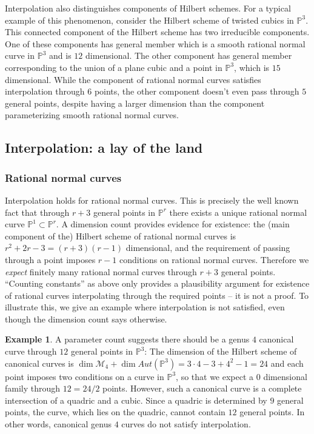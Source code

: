 \documentclass[reqno, 11pt]{amsart}
\theoremstyle{definition}
\theoremstyle{remark}
\numberwithin{equation}{section}
\numberwithin{thm}{section}
\numberwithin{prop}{section}
\numberwithin{lem}{section}
\numberwithin{cor}{section}
\numberwithin{conj}{section}
\numberwithin{defn}{section}
\theoremstyle{plain}
\theoremstyle{definition}
\newtheorem{example}[theorem]{Example}
\newcommand\ssec{\subsection}
\newcommand\sssec{\subsubsection}
\newcommand\bp{{\mathbb P}}
\begin{document}
 Interpolation also distinguishes components of Hilbert schemes. For a typical example of this phenomenon,
consider the Hilbert scheme of twisted cubics in $\bp^3$.
This connected component of the Hilbert scheme has two
irreducible components.
One of these components has general member which is a smooth
rational normal curve in $\bp^3$ and is $12$ dimensional.
The other component
has general member corresponding to the union of a plane
cubic and a point in $\bp^3$, which is $15$ dimensional.
While the component of rational normal curves satisfies interpolation
through $6$ points, the other component doesn't 
even pass through $5$ general points, despite having
a larger dimension than the component parameterizing
smooth rational normal curves.

\ssec{Interpolation: a lay of the land}\label{section:lay-of-land}

\sssec{Rational normal curves}
\label{sssec:castelnuovos-lemma}

Interpolation holds for rational normal curves.
This is precisely the well known fact that through $r+3$ general points in $\bp^{r}$ there exists a unique rational normal curve $\bp^{1} \subset \bp^{r}$.  A dimension count provides evidence for existence: the (main component of the) Hilbert scheme of rational normal curves is $r^{2}+2r-3 = (r+3)(r-1)$ dimensional, and the requirement of passing through a point imposes $r-1$ conditions on rational normal curves. Therefore we {\sl expect} finitely many rational normal curves through $r+3$ general points.  
``Counting constants'' as above  only provides a plausibility argument for existence of rational curves interpolating through the required points -- it is not a proof. To illustrate this, we give an example where interpolation is not satisfied, even though the dimension count says otherwise.

\begin{example}
	\label{example:}
	A parameter count suggests there should be a genus $4$ canonical curve through $12$ general points in $\bp^{3}$: The dimension of the Hilbert scheme of canonical curves is $\dim \mathscr M_4 + \dim Aut(\bp^3) = 3 \cdot 4 - 3 + 4^2 - 1 = 24$ and each point imposes two conditions on a curve in $\bp^3$, so that
	we expect a $0$ dimensional family through $12 = 24/2$ points. However, such a canonical
	curve is a complete intersection of a quadric and a cubic.
	Since
	a quadric is determined by $9$ general points,
	the curve,
	which lies on the quadric, cannot contain $12$ general points.
	In other words, canonical genus $4$ curves do not satisfy interpolation.
\end{example}
\end{document}
